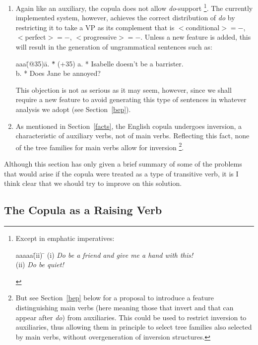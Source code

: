 \begin{enumerate}
\item Again like an auxiliary, the copula does not allow 
{\em do\/}-support%
%
\footnote{Except in emphatic imperatives:
\begin{tabbing}
aaaaa\=(ii) \= \kill
     \>(i)  \> {\em Do be a friend and give me a hand with this!} \\
     \>(ii) \> {\em Do be quiet!}
\end{tabbing}
}. 
%
The currently implemented system, however, achieves the correct
distribution of {\em do} by restricting it to take a VP as its
complement that is $<$conditional$>=-$, $<$perfect$>=-$, $<$progressive$>=-$.
Unless a new feature is added, this will result in the generation of
ungrammatical sentences such as:
\begin{tabbing}
aaa\=(@35)\= a. \= *\= \kill
   \>(+35)\> a. \> *\> Isabelle doesn't be a barrister. \\
   \>    \> b. \>  *\> Does Jane be annoyed? 
\end{tabbing}
This objection is not as serious as it may seem, however, since we shall
require a new feature to avoid generating this type of sentences in
whatever analysis we adopt (see Section~\ref{bep}). 
%
%
%

\item As mentioned in Section~\ref{facts}, the English copula undergoes
inversion, a characteristic of auxiliary verbs, not of main verbs.
Reflecting this fact, none of the tree families for main verbs allow for
inversion%
%
\footnote{But see Section~\ref{bep} below for a proposal to introduce a
feature distinguishing main verbs (here meaning those that invert and
that can appear after {\em do\/}) from auxiliaries. This could be used to
restrict inversion to auxiliaries, thus allowing them in principle to
select tree families also selected by main verbs, without overgeneration
of inversion structures.}.
\end{enumerate}

Although this section has only given a brief summary of some of the
problems that would arise if the copula were treated as a type of
transitive verb, it is I think clear that we should try to improve on
this solution.

\subsection{The Copula as a Raising Verb}


